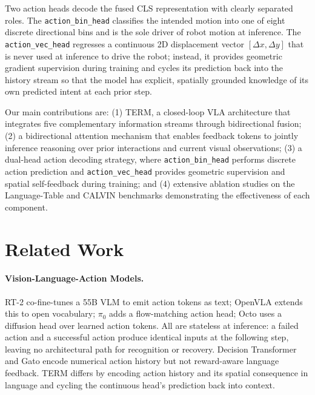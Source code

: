 \documentclass[letterpaper]{article} %
\begin{document}
Two action heads decode the fused CLS representation with clearly separated roles. The \texttt{action\_bin\_head} classifies the intended motion into one of eight discrete directional bins and is the sole driver of robot motion at inference. The \texttt{action\_vec\_head} regresses a continuous 2D displacement vector $[\Delta x, \Delta y]$ that is never used at inference to drive the robot; instead, it provides geometric gradient supervision during training and cycles its prediction back into the history stream so that the model has explicit, spatially grounded knowledge of its own predicted intent at each prior step.

Our main contributions are: (1) TERM, a closed-loop VLA architecture that integrates five complementary information streams through bidirectional fusion; (2) a bidirectional attention mechanism that enables feedback tokens to jointly inference reasoning over prior interactions and current visual observations; (3) a dual-head action decoding strategy, where \texttt{action\_bin\_head} performs discrete action prediction and \texttt{action\_vec\_head} provides geometric supervision and spatial self-feedback during training; and (4) extensive ablation studies on the Language-Table and CALVIN benchmarks demonstrating the effectiveness of each component.

\section{Related Work}

\paragraph{Vision-Language-Action Models.}
RT-2 \cite{brohan2023rt2} co-fine-tunes a 55B VLM to emit action tokens as text; OpenVLA \cite{kim2024openvla} extends this to open vocabulary; $\pi_0$ \cite{black2024pi0} adds a flow-matching action head; Octo \cite{octo2024} uses a diffusion head over learned action tokens. All are stateless at inference: a failed action and a successful action produce identical inputs at the following step, leaving no architectural path for recognition or recovery. Decision Transformer \cite{chen2021decision} and Gato \cite{reed2022gato} encode numerical action history but not reward-aware language feedback. TERM differs by encoding action history and its spatial consequence in language and cycling the continuous head's prediction back into context.
\end{document}
